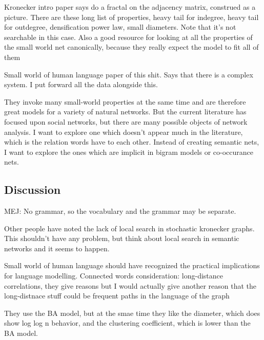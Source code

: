 \documentclass[12pt]{article}
\begin{document}
Kronecker intro paper says do a fractal on the adjacency matrix, construed as a picture. There are these long list of properties, heavy tail for indegree, heavy tail for outdegree, densification power law, small diameters. Note that it's not searchable in this case. Also a good resource for looking at all the properties of the small world net canonically, because they really expect the model to fit all of them

Small world of human language paper of this shit. Says that there is a complex system. I put forward all the data alongside this.

They invoke many small-world properties at the same time and are therefore great models for a variety of natural networks. But the current literature has focused upon social networks, but there are many possible objects of network analysis. I want to explore one which doesn't appear much in the literature, which is the relation words have to each other. Instead of creating semantic nets, I want to explore the ones which are implicit in bigram models or co-occurance nets.

\subsection{Discussion} %
MEJ: No grammar, so the vocabulary and the grammar may be separate.

Other people have noted the lack of local search in stochastic kronecker graphs. This shouldn't have any problem, but think about local search in semantic networks and it seems to happen.

Small world of human language should have recognized the practical implications for language modelling. Connected words consideration: long-distance correlations, they give reasons but I would actually give another reason that the long-distnace stuff could be frequent paths in the language of the graph

They use the BA model, but at the smae time they like the diameter, which does show log log n behavior, and the clustering coefficient, which is lower than the BA model.

\end{document}
